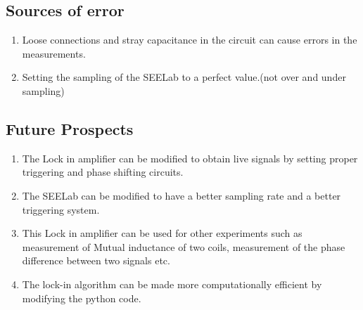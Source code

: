 \documentclass{article}
\begin{document}
\begin{multicols}{2}
\subsection{Sources of error}
\begin{enumerate}
    \item Loose connections and stray capacitance in the circuit can cause errors in the measurements.
    \item Setting the sampling of the SEELab to a perfect value.(not over and under sampling)
\end{enumerate}

\subsection{Future Prospects}
\begin{enumerate}
    \item The Lock in amplifier can be modified to obtain live signals by setting proper triggering and phase shifting circuits.
    \item The SEELab can be modified to have a better sampling rate and a better triggering system.
    \item This Lock in amplifier can be used for other experiments such as measurement of Mutual inductance of two coils, measurement of the phase difference between two signals etc.
    \item The lock-in algorithm can be made more computationally efficient by modifying the python code.
\end{enumerate}


\end{multicols}


\end{document}
